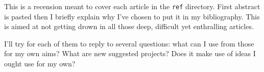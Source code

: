


This is a recension meant to cover each article in the \texttt{ref} directory. First abstract is pasted then I briefly explain why I've chosen to put it in my bibliography. This is aimed at not getting drown in all those deep, difficult yet enthralling articles.

I'll try for each of them to reply to several questions: what can I use from those for my own aims? What are new suggested projects? Does it make use of ideas I ought use for my own?